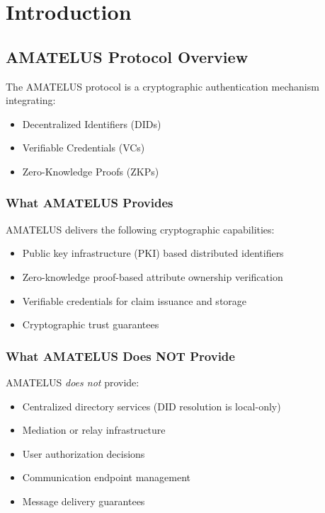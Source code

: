 \chapter{Introduction}

\section{AMATELUS Protocol Overview}

\begin{definition}
  \label{def:amatelus}
  The AMATELUS protocol is a cryptographic authentication mechanism integrating:
  \begin{itemize}
    \item Decentralized Identifiers (DIDs)
    \item Verifiable Credentials (VCs)
    \item Zero-Knowledge Proofs (ZKPs)
  \end{itemize}
  \leanok
\end{definition}

\subsection{What AMATELUS Provides}

\begin{proposition}
  \label{prop:amatelus-capabilities}
  AMATELUS delivers the following cryptographic capabilities:
  \begin{itemize}
    \item Public key infrastructure (PKI) based distributed identifiers
    \item Zero-knowledge proof-based attribute ownership verification
    \item Verifiable credentials for claim issuance and storage
    \item Cryptographic trust guarantees
  \end{itemize}
  \leanok
\end{proposition}

\subsection{What AMATELUS Does NOT Provide}

\begin{proposition}
  \label{prop:amatelus-non-scope}
  AMATELUS \emph{does not} provide:
  \begin{itemize}
    \item Centralized directory services (DID resolution is local-only)
    \item Mediation or relay infrastructure
    \item User authorization decisions
    \item Communication endpoint management
    \item Message delivery guarantees
  \end{itemize}
\end{proposition}

